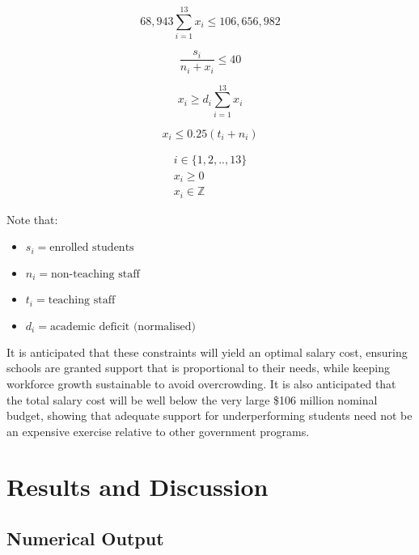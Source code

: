 \documentclass[11pt, a4paper]{article}
\begin{document}
    \begin{equation}
        68,943\sum_{i=1}^{13} x_i \leq 106,656,982
        \label{first_constraint3}
    \end{equation}

    \begin{equation}
        \frac{s_i}{n_i + x_i} \leq 40
    \end{equation}

    \begin{equation}
        x_i \geq d_i\sum_{i=1}^{13} x_i
    \end{equation}

    \begin{equation}
        x_i \leq 0.25(t_i + n_i)
        \label{last_constraint3}
    \end{equation}

    \begin{gather}
        i \in \{1, 2, .., 13\} \\
        x_i \geq 0 \\
        x_i \in \mathbb{Z}            
    \end{gather}

    Note that:

    \begin{itemize}
        \item $s_i = \textrm{enrolled students}$
        \item $n_i = \textrm{non-teaching staff}$
        \item $t_i = \textrm{teaching staff}$
        \item $d_i = \textrm{academic deficit (normalised)}$
    \end{itemize}

    It is anticipated that these constraints will yield an optimal salary cost, ensuring schools are granted support that is proportional to their needs, while keeping workforce growth sustainable to avoid overcrowding. It is also anticipated that the total salary cost will be well below the very large \$106 million nominal budget, showing that adequate support for underperforming students need not be an expensive exercise relative to other government programs.

    \section{Results and Discussion}

    \subsection{Numerical Output}
\end{document}
